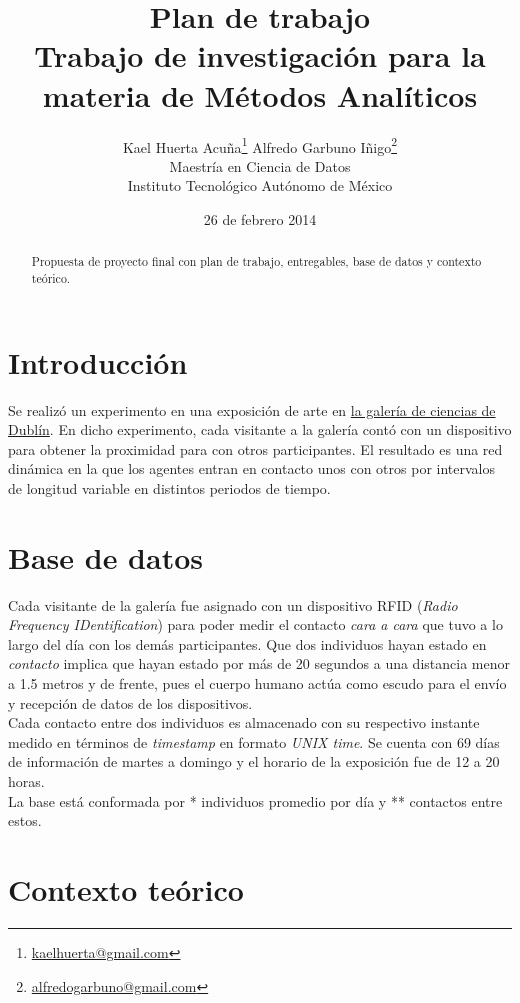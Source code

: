 \documentclass[10pt]{article}
\title{Plan de trabajo \\ {\large Trabajo de investigación
    para la materia de Métodos Analíticos} }
\author{Kael Huerta Acuña\footnote{
  \href{mailto:kaelhuerta@gmail.com}{kaelhuerta@gmail.com} }
  \qquad Alfredo Garbuno Iñigo\footnote{
  \href{mailto:alfredogarbuno@gmail.com}{alfredogarbuno@gmail.com} }\\
    {\small Maestría en Ciencia de Datos} \\
    {\small  Instituto Tecnológico Autónomo de México}}
\date{26 de febrero 2014}
\begin{document}
\maketitle

\begin{abstract}
Propuesta de proyecto final con plan de trabajo, entregables, base de datos y
contexto teórico.
\end{abstract}



\section{Introducción}
\label{sec:intro}

Se realizó un experimento en una exposición de arte en \href{https://dublin.sciencegallery.com/}{la galería de ciencias de Dublín}. En dicho experimento,
cada visitante a la galería contó con un dispositivo para obtener la proximidad
para con otros participantes. El resultado es una red dinámica en la que los
agentes entran en contacto unos con otros por intervalos de longitud variable
en distintos periodos de tiempo.\\



\section{Base de datos}
\label{sec:datos}

Cada visitante de la galería fue asignado con un dispositivo RFID ({\it Radio
Frequency IDentification}) para poder medir el contacto {\it cara a cara} que
tuvo a lo largo del día con los demás participantes. Que dos individuos hayan
estado en {\it contacto} implica que hayan estado por más de 20 segundos a una
distancia menor a 1.5 metros y de frente, pues el cuerpo humano actúa como
escudo para el envío y recepción de datos de los dispositivos.\\

Cada contacto entre dos individuos es almacenado con su respectivo instante
medido en términos de {\it timestamp} en formato {\it UNIX time}. Se cuenta
con 69 días de información de martes a domingo y el horario de la exposición
fue de 12 a 20 horas.\\

La base está conformada por * individuos promedio por día y ** contactos entre
estos.



\section{Contexto teórico}
\end{document}
